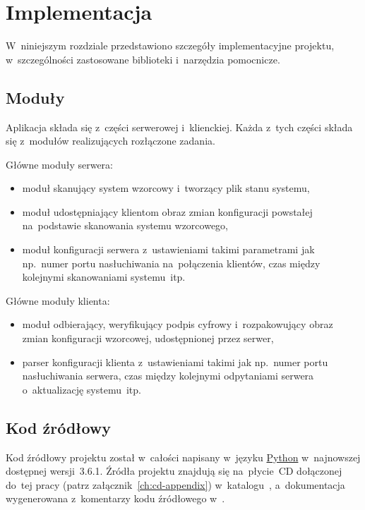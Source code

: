 \documentclass[thesis]{subfiles}
\begin{document}
\chapter{Implementacja}

W~niniejszym rozdziale przedstawiono szczegóły implementacyjne projektu, w~szczególności zastosowane biblioteki i~narzędzia pomocnicze.


\section{Moduły}

Aplikacja składa się z~części serwerowej i~klienckiej. Każda z~tych części składa się z~modułów realizujących rozłączone zadania.

Główne moduły serwera:\mynobreakpar
\begin{itemize}
	\item moduł skanujący system wzorcowy i~tworzący plik stanu systemu,
	\item moduł udostępniający klientom obraz zmian konfiguracji powstałej na~podstawie skanowania systemu wzorcowego,
	\item moduł konfiguracji serwera z~ustawieniami takimi parametrami jak np.~numer portu nasłuchiwania na~połączenia klientów, czas między kolejnymi skanowaniami systemu~itp.
\end{itemize}

Główne moduły klienta:\mynobreakpar
\begin{itemize}
	\item moduł odbierający, weryfikujący podpis cyfrowy i~rozpakowujący obraz zmian konfiguracji wzorcowej, udostępnionej przez serwer,
	\item parser konfiguracji klienta z~ustawieniami takimi jak np.~numer portu nasłuchiwania serwera, czas między kolejnymi odpytaniami serwera o~aktualizację systemu~itp.
\end{itemize}


\section{Kod źródłowy}

Kod źródłowy projektu został w~całości napisany w~języku \href{https://en.wikipedia.org/wiki/Python_(programming_language)}{Python} w~najnowszej dostępnej wersji~3.6.1. Źródła projektu znajdują się na~płycie~CD dołączonej do~tej pracy (patrz załącznik~\ref{ch:cd-appendix}) w~katalogu~, a~dokumentacja wygenerowana z~komentarzy kodu źródłowego w~.
\end{document}
